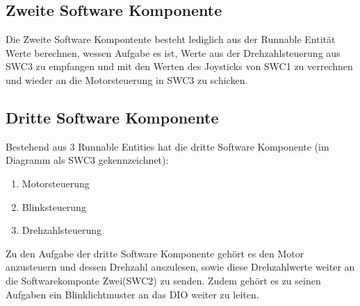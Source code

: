 \subsection{Zweite Software Komponente}
Die Zweite Software Kompontente besteht lediglich aus der Runnable Entität \dq Werte berechnen\dq, wessen Aufgabe es ist, Werte aus der Drehzahlsteuerung aus SWC3 zu empfangen und mit den Werten des Joysticks von SWC1 zu verrechnen und wieder an die Motorsteuerung in SWC3 zu schicken.

\subsection{Dritte Software Komponente}
Bestehend aus 3 Runnable Entities hat die dritte Software Komponente (im Diagramm als SWC3 gekennzeichnet):
\begin{enumerate}
\item Motorsteuerung
\item Blinksteuerung
\item Drehzahlsteuerung
\end{enumerate}
Zu den Aufgabe der dritte Software Komponente gehört es den Motor anzusteuern und dessen Drehzahl auszulesen, sowie diese Drehzahlwerte weiter an die Softwarekomponte Zwei(SWC2) zu senden. Zudem gehört es zu seinen Aufgaben ein Blinklichtmuster an das DIO weiter zu leiten.

